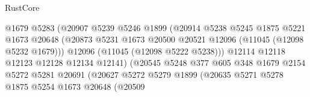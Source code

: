 \begin{lexlean}{RustCore}
\begin{coremodule}
                                          @1679
                                          @5283
                                          (@20907
                                            @5239
                                            @5246
                                            @1899
                                            (@20914
                                              @5238
                                              @5245
                                              @1875
                                              @5221
                                              @1673
                                              @20648
                                              (@20873
                                                @5231
                                                @1673
                                                @20500
                                                @20521
                                                @12096
                                                (@11045 (@12098 @5232 @1679)))
                                              @12096
                                              (@11045 (@12098 @5222 @5238)))
                                            @12114
                                            @12118
                                            @12123
                                            @12128
                                            @12134
                                            @12141)
                                          (@20545
                                            @5248
                                            @377
                                            @605
                                            @348
                                            @1679
                                            @2154
                                            @5272
                                            @5281
                                            @20691
                                            (@20627
                                              @5272
                                              @5279
                                              @1899
                                              (@20635
                                                @5271
                                                @5278
                                                @1875
                                                @5254
                                                @1673
                                                @20648
                                                (@20509

\end{coremodule}
\end{lexlean}
